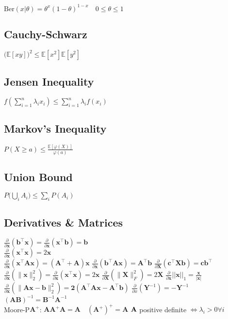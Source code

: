 $\text{Ber}(x|\theta) = \theta^x(1-\theta)^{1-x} \quad 0 \leq \theta \leq 1$
\subsection*{Cauchy-Schwarz}
$\big(\mathbb{E}[xy]\big)^2 \leqslant \mathbb{E}[x^2]\mathbb{E}[y^2]$
\subsection*{Jensen Inequality}
$f(\sum_{i=1}^n \lambda_i x_i) \leq \sum_{i=1}^n \lambda_i f(x_i)$
\subsection*{Markov's Inequality}
$P(X \geq a) \leq \frac{\mathbb{E}[\varphi(X)]}{\varphi(a)}$
\subsection*{Union Bound}
$P\big(\bigcup_i A_i\big) \leq \sum_iP(A_i)$

\subsection*{Derivatives \& Matrices}
$\frac{\partial}{\partial \mathbf{x}}(\mathbf{b}^\top \mathbf{x}) = \frac{\partial}{\partial \mathbf{x}}(\mathbf{x}^\top \mathbf{b}) = \mathbf{b}$ \\
$\frac{\partial}{\partial \mathbf{x}}(\mathbf{x}^\top \mathbf{x}) = 2\mathbf{x}$ \\
$\frac{\partial}{\partial \mathbf{x}}(\mathbf{x}^\top \mathbf{A}\mathbf{x}) = (\mathbf{A}^\top + \mathbf{A})\mathbf{x}$ \quad
$\frac{\partial}{\partial \mathbf{x}}(\mathbf{b}^\top \mathbf{A}\mathbf{x}) = \mathbf{A}^\top \mathbf{b}$ \quad
$\frac{\partial}{\partial \mathbf{X}}(\mathbf{c}^\top \mathbf{X} \mathbf{b}) = \mathbf{c}\mathbf{b}^\top$ \quad \\
$\frac{\partial}{\partial \mathbf{x}}(\|\mathbf{x}\|^2_2) = \frac{\partial}{\partial \mathbf{x}} (\mathbf{x}^\top \mathbf{x}) = 2\mathbf{x}$ \quad
$\frac{\partial}{\partial \mathbf{X}}(\|\mathbf{X}\|_F^2) = 2\mathbf{X}$  \quad \quad
$\frac{\partial}{\partial \mathbf{x}}||\mathbf{x}||_1 = \frac{\mathbf{x}}{|\mathbf{x}|}$ \\
$\frac{\partial}{\partial \mathbf{x}}(\|\mathbf{Ax - b}\|_2^2) = \mathbf{2(A^\top Ax-A^\top b)}$ \quad
$\frac{\partial}{\partial x}(\mathbf{Y}^{-1}) = -\mathbf{Y}^{-1}$ \\
$(\mathbf{AB})^{-1} = \mathbf{B}^{-1}\mathbf{A}^{-1}$ \\
Moore-P$\mathbf{A^+}$: $\mathbf{AA^+A} = \mathbf{A}\quad (\mathbf{A^+})^+=\mathbf{A}$
$\mathbf{A}\space $ positive definite $\iff \lambda_i>0\forall i$

